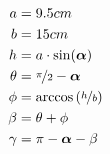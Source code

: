 \documentclass[a4paper]{report}
\begin{document}
\begin{align*}
	a &= 9.5 cm\\
	b &= 15 cm\\
	h &= a \cdot \sin(\bm{\alpha})\\
	\theta &= \nicefrac{\pi}{2} - \bm{\alpha}\\
	\phi &= \arccos\left(\nicefrac{h}{b}\right)\\
	\beta &= \theta + \phi\\
	\gamma &= \pi - \bm{\alpha} - \beta\\
\end{align*}
\end{document}
